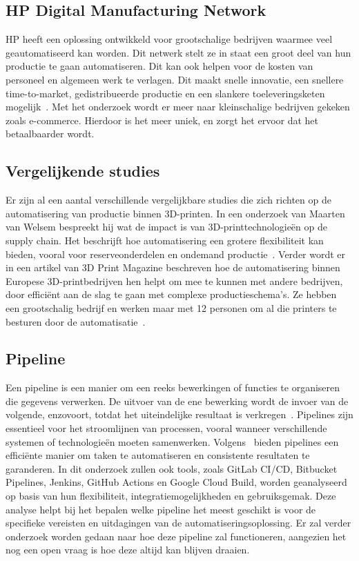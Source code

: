 \subsection{HP Digital Manufacturing Network}%

HP heeft een oplossing ontwikkeld voor grootschalige bedrijven waarmee veel geautomatiseerd kan worden. Dit netwerk stelt ze in staat een groot deel van hun productie te gaan automatiseren. Dit kan ook helpen voor de kosten van personeel en algemeen werk te verlagen. Dit maakt snelle innovatie, een snellere time-to-market, gedistribueerde productie en een slankere toeleveringsketen mogelijk~\autocite{hp3DprintingNetwork}. Met het onderzoek wordt er meer naar kleinschalige bedrijven gekeken zoals e-commerce. Hierdoor is het meer uniek, en zorgt het ervoor dat het betaalbaarder wordt.



\subsection{Vergelijkende studies}%

Er zijn al een aantal verschillende vergelijkbare studies die zich richten op de automatisering van productie binnen 3D-printen. In een onderzoek van Maarten van Welsem bespreekt hij wat de impact is van 3D-printtechnologieën op de supply chain. Het beschrijft hoe automatisering een grotere flexibiliteit kan bieden, vooral voor reserveonderdelen en ondemand productie~\autocite{emerce3DprintSupplyChain}. Verder wordt er in een artikel van 3D Print Magazine beschreven hoe de automatisering binnen Europese 3D-printbedrijven hen helpt om mee te kunnen met andere bedrijven, door efficiënt aan de slag te gaan met complexe productieschema's. Ze hebben een grootschalig bedrijf en werken maar met 12 personen om al die printers te besturen door de automatisatie~\autocite{3dprintmagAutomation}. 


\subsection{Pipeline}%

Een pipeline is een manier om een reeks bewerkingen of functies te organiseren die gegevens verwerken. De uitvoer van de ene bewerking wordt de invoer van de volgende, enzovoort, totdat het uiteindelijke resultaat is verkregen~\autocite{pythonPipelinesThakur}. Pipelines zijn essentieel voor het stroomlijnen van processen, vooral wanneer verschillende systemen of technologieën moeten samenwerken. Volgens~\autocite{thesusVirtanen} bieden pipelines een efficiënte manier om taken te automatiseren en consistente resultaten te garanderen. In dit onderzoek zullen ook tools, zoals GitLab CI/CD, Bitbucket Pipelines, Jenkins, GitHub Actions en Google Cloud Build, worden geanalyseerd op basis van hun flexibiliteit, integratiemogelijkheden en gebruiksgemak. Deze analyse helpt bij het bepalen welke pipeline het meest geschikt is voor de specifieke vereisten en uitdagingen van de automatiseringsoplossing. Er zal verder onderzoek worden gedaan naar hoe deze pipeline zal functioneren, aangezien het nog een open vraag is hoe deze altijd kan blijven draaien.

